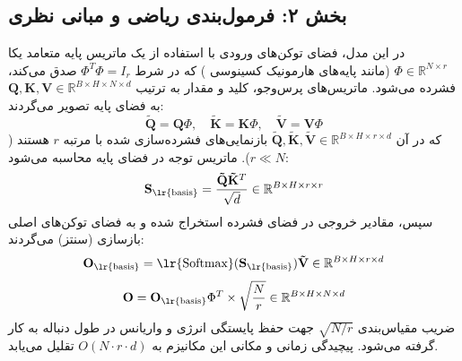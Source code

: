 \subsection*{بخش ۲: فرمول‌بندی ریاضی و مبانی نظری }
در این مدل، فضای توکن‌های ورودی با استفاده از یک ماتریس پایه متعامد یکا $\Phi \in \mathbb{R}^{N \times r}$ (مانند پایه‌های هارمونیک کسینوسی ) که در شرط $\Phi^T \Phi = I_r$ صدق می‌کند، فشرده می‌شود.
ماتریس‌های پرس‌وجو، کلید و مقدار به ترتیب $\mathbf{Q}, \mathbf{K}, \mathbf{V} \in \mathbb{R}^{B \times H \times N \times d}$ به فضای پایه تصویر می‌گردند:
\begin{equation}
\mathbf{\tilde{Q}} = \mathbf{Q} \Phi, \quad \mathbf{\tilde{K}} = \mathbf{K} \Phi, \quad \mathbf{\tilde{V}} = \mathbf{V} \Phi
\end{equation}
که در آن $\mathbf{\tilde{Q}}, \mathbf{\tilde{K}}, \mathbf{\tilde{V}} \in \mathbb{R}^{B \times H \times r \times d}$ بازنمایی‌های فشرده‌سازی شده با مرتبه $r$ هستند ($r \ll N$).
ماتریس توجه در فضای پایه محاسبه می‌شود:
\begin{equation}
\mathbf{S}_{\text{\lr{basis}}} = \frac{\mathbf{\tilde{Q}} \mathbf{\tilde{K}}^T}{\sqrt{d}} \in \mathbb{R}^{B \times H \times r \times r}
\end{equation}
سپس، مقادیر خروجی در فضای فشرده استخراج شده و به فضای توکن‌های اصلی بازسازی (سنتز) می‌گردند:
\begin{equation}
\mathbf{O}_{\text{\lr{basis}}} = \text{\lr{Softmax}}(\mathbf{S}_{\text{\lr{basis}}}) \mathbf{\tilde{V}} \in \mathbb{R}^{B \times H \times r \times d}
\end{equation}
\begin{equation}
\mathbf{O} = \mathbf{O}_{\text{\lr{basis}}} \Phi^T \times \sqrt{\frac{N}{r}} \in \mathbb{R}^{B \times H \times N \times d}
\end{equation}
ضریب مقیاس‌بندی $\sqrt{N/r}$ جهت حفظ پایستگی انرژی و واریانس در طول دنباله به کار گرفته می‌شود. پیچیدگی زمانی و مکانی این مکانیزم به $O(N \cdot r \cdot d)$ تقلیل می‌یابد.

